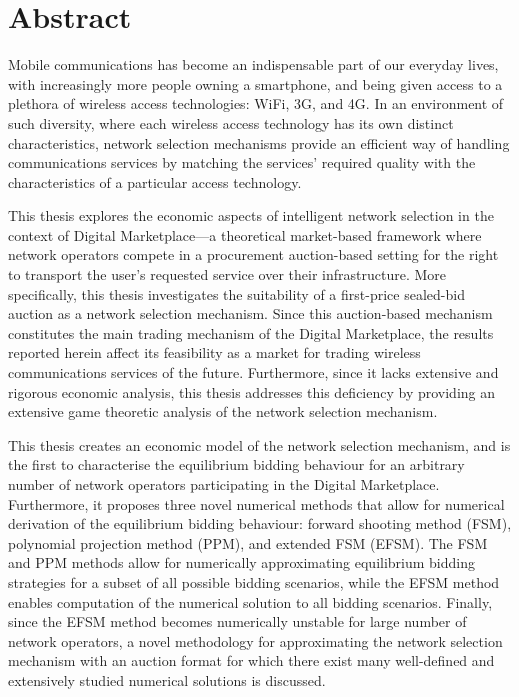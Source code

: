 \chapter*{Abstract} %
\label{cha:abstract}

Mobile communications has become an indispensable part of our everyday lives, with increasingly more people owning a smartphone, and being given access to a plethora of wireless access technologies: WiFi, 3G, and 4G. In an environment of such diversity, where each wireless access technology has its own distinct characteristics, network selection mechanisms provide an efficient way of handling communications services by matching the services' required quality with the characteristics of a particular access technology.

This thesis explores the economic aspects of intelligent network selection in the context of Digital Marketplace---a theoretical market-based framework where network operators compete in a procurement auction-based setting for the right to transport the user's requested service over their infrastructure. More specifically, this thesis investigates the suitability of a first-price sealed-bid auction as a network selection mechanism. Since this auction-based mechanism constitutes the main trading mechanism of the Digital Marketplace, the results reported herein affect its feasibility as a market for trading wireless communications services of the future. Furthermore, since it lacks extensive and rigorous economic analysis, this thesis addresses this deficiency by providing an extensive game theoretic analysis of the network selection mechanism. 

This thesis creates an economic model of the network selection mechanism, and is the first to characterise the equilibrium bidding behaviour for an arbitrary number of network operators participating in the Digital Marketplace. Furthermore, it proposes three novel numerical methods that allow for numerical derivation of the equilibrium bidding behaviour: forward shooting method (FSM), polynomial projection method (PPM), and extended FSM (EFSM). The FSM and PPM methods allow for numerically approximating equilibrium bidding strategies for a subset of all possible bidding scenarios, while the EFSM method enables computation of the numerical solution to all bidding scenarios. Finally, since the EFSM method becomes numerically unstable for large number of network operators, a novel methodology for approximating the network selection mechanism with an auction format for which there exist many well-defined and extensively studied numerical solutions is discussed. 
